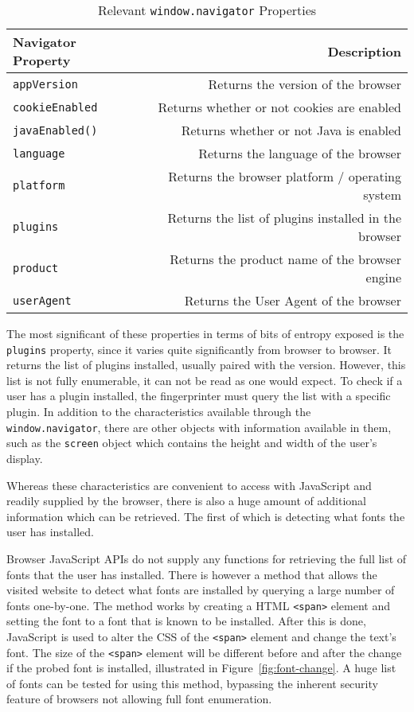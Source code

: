 \begin{table}[h]
\centering
\begin{tabular}{| l | r |}
    \hline
    \textbf{Navigator Property} & \textbf{Description} \\ \hline
    \texttt{appVersion} & {Returns the version of the browser} \\ \hline
    \texttt{cookieEnabled} & {Returns whether or not cookies are enabled} \\ \hline
    \texttt{javaEnabled()} & {Returns whether or not Java is enabled} \\ \hline
    \texttt{language} & {Returns the language of the browser} \\ \hline
    \texttt{platform} & {Returns the browser platform / operating system} \\ \hline
    \texttt{plugins} & {Returns the list of plugins installed in the browser} \\ \hline
    \texttt{product} & {Returns the product name of the browser engine} \\ \hline
    \texttt{userAgent} & {Returns the User Agent of the browser} \\
    \hline
\end{tabular}
\caption{Relevant \texttt{window.navigator} Properties}
\label{tab:navigator-props}
\end{table}

The most significant of these properties in terms of bits of entropy exposed is the \texttt{plugins} property, since it varies quite significantly from browser to browser.
It returns the list of plugins installed, usually paired with the version.
However, this list is not fully enumerable, it can not be read as one would expect.
To check if a user has a plugin installed, the fingerprinter must query the list with a specific plugin.
In addition to the characteristics available through the \texttt{window.navigator}, there are other objects with information available in them, such as the \texttt{screen} object which contains the height and width of the user's display.

Whereas these characteristics are convenient to access with JavaScript and readily supplied by the browser, there is also a huge amount of additional information which can be retrieved.
The first of which is detecting what fonts the user has installed.

Browser JavaScript APIs do not supply any functions for retrieving the full list of fonts that the user has installed.
There is however a method that allows the visited website to detect what fonts are installed by querying a large number of fonts one-by-one.
The method works by creating a HTML \texttt{<span>} element and setting the font to a font that is known to be installed.
After this is done, JavaScript is used to alter the CSS of the \texttt{<span>} element and change the text's font.
The size of the \texttt{<span>} element will be different before and after the change if the probed font is installed, illustrated in Figure~\ref{fig:font-change}.
A huge list of fonts can be tested for using this method, bypassing the inherent security feature of browsers not allowing full font enumeration.

